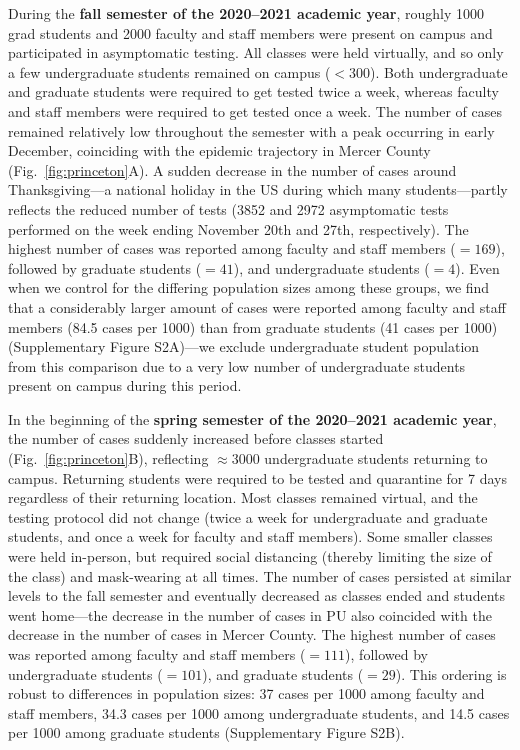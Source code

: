 \documentclass[12pt]{article}
\newcommand{\fref}[1]{Fig.~\ref{fig:#1}}
\begin{document}
During the \textbf{fall semester of the 2020--2021 academic year}, roughly 1000 grad students and 2000 faculty and staff members were present on campus and participated in asymptomatic testing. 
All classes were held virtually, and so only a few undergraduate students remained on campus ($<300$).  
Both undergraduate and graduate students were required to get tested twice a week, whereas faculty and staff members were required to get tested once a week.
The number of cases remained relatively low throughout the semester with a peak occurring in early December, coinciding with the epidemic trajectory in Mercer County (\fref{princeton}A).  
A sudden decrease in the number of cases around Thanksgiving---a national holiday in the US during which many students---partly reflects the reduced number of tests (3852 and 2972 asymptomatic tests performed on the week ending November 20th and 27th, respectively).
The highest number of cases was reported among faculty and staff members ($=169$), followed by graduate students ($=41$), and undergraduate students ($=4$).
Even when we control for the differing population sizes among these groups, we find that a considerably larger amount of cases were reported among faculty and staff members (84.5 cases per 1000) than from graduate students (41 cases per 1000) (Supplementary Figure S2A)---we exclude undergraduate student population from this comparison due to a very low number of undergraduate students present on campus during this period.

In the beginning of the \textbf{spring semester of the 2020--2021 academic year}, the number of cases suddenly increased before classes started (\fref{princeton}B), reflecting $\approx 3000$ undergraduate students returning to campus.
Returning students were required to be tested and quarantine for 7 days regardless of their returning location.
Most classes remained virtual, and the testing protocol did not change (twice a week for undergraduate and graduate students, and once a week for faculty and staff members).
Some smaller classes were held in-person, but required social distancing (thereby limiting the size of the class) and mask-wearing at all times.
The number of cases persisted at similar levels to the fall semester and eventually decreased as classes ended and students went home---the decrease in the number of cases in PU also coincided with the decrease in the number of cases in Mercer County.
The highest number of cases was reported among faculty and staff members ($=111$), followed by undergraduate students ($=101$), and graduate students ($=29$).
This ordering is robust to differences in population sizes: 37 cases per 1000 among faculty and staff members, 34.3 cases per 1000 among undergraduate students, and 14.5 cases per 1000 among graduate students (Supplementary Figure S2B).
\end{document}
